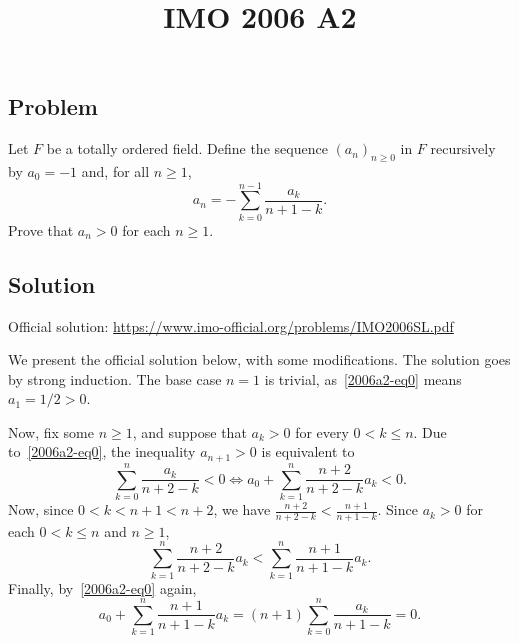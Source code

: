 \documentclass{article}
\title{IMO 2006 A2}
\author{}
\date{}
\begin{document}
\maketitle



\subsection*{Problem}

Let $F$ be a totally ordered field.
Define the sequence $(a_n)_{n \geq 0}$ in $F$ recursively by $a_0 = -1$ and, for all $n \geq 1$,
\[ a_n = - \sum_{k = 0}^{n - 1} \frac{a_k}{n + 1 - k}. \tag{*}\label{2006a2-eq0} \]
Prove that $a_n > 0$ for each $n \geq 1$.



\subsection*{Solution}

Official solution: \url{https://www.imo-official.org/problems/IMO2006SL.pdf}

We present the official solution below, with some modifications.
The solution goes by strong induction.
The base case $n = 1$ is trivial, as~\eqref{2006a2-eq0} means $a_1 = 1/2 > 0$.

Now, fix some $n \geq 1$, and suppose that $a_k > 0$ for every $0 < k \leq n$.
Due to~\eqref{2006a2-eq0}, the inequality $a_{n + 1} > 0$ is equivalent to
\[ \sum_{k = 0}^n \frac{a_k}{n + 2 - k} < 0 \iff a_0 + \sum_{k = 1}^n \frac{n + 2}{n + 2 - k} a_k < 0. \]
Now, since $0 < k < n + 1 < n + 2$, we have $\frac{n + 2}{n + 2 - k} < \frac{n + 1}{n + 1 - k}$.
Since $a_k > 0$ for each $0 < k \leq n$ and $n \geq 1$,
\[ \sum_{k = 1}^n \frac{n + 2}{n + 2 - k} a_k < \sum_{k = 1}^n \frac{n + 1}{n + 1 - k} a_k. \]
Finally, by~\eqref{2006a2-eq0} again,
\[ a_0 + \sum_{k = 1}^n \frac{n + 1}{n + 1 - k} a_k = (n + 1) \sum_{k = 0}^n \frac{a_k}{n + 1 - k} = 0. \]
\end{document}
